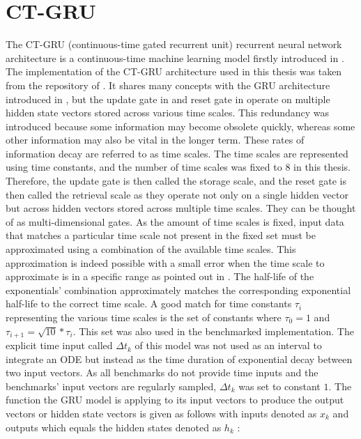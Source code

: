 \documentclass[draft,final]{vutinfth} %
\begin{document}
    \section{CT-GRU} \label{ctgru}
    The CT-GRU (continuous-time gated recurrent unit) recurrent neural network architecture is a continuous-time machine learning model firstly introduced in \cite{CTGRU}.
    The implementation of the CT-GRU architecture used in this thesis was taken from the repository of \cite{ODELSTM}.
    It shares many concepts with the GRU architecture introduced in , but the update gate in  and reset gate in  operate on multiple hidden state vectors stored across various time scales.
    This redundancy was introduced because some information may become obsolete quickly, whereas some other information may also be vital in the longer term.
    These rates of information decay are referred to as time scales.
    The time scales are represented using time constants, and the number of time scales was fixed to $8$ in this thesis.
    Therefore, the update gate is then called the storage scale, and the reset gate is then called the retrieval scale as they operate not only on a single hidden vector but across hidden vectors stored across multiple time scales.
    They can be thought of as multi-dimensional gates.
    As the amount of time scales is fixed, input data that matches a particular time scale not present in the fixed set must be approximated using a combination of the available time scales.
    This approximation is indeed possible with a small error when the time scale to approximate is in a specific range as pointed out in \cite[p. 5-6]{CTGRU}.
    The half-life of the exponentials' combination approximately matches the corresponding exponential half-life to the correct time scale.
    A good match for time constants $\tau_i$ representing the various time scales is the set of constants where $\tau_0=1$ and $\tau_{i+1} = \sqrt{10} * \tau_{i}$.
    This set was also used in the benchmarked implementation.
    The explicit time input called $\Delta t_k$ of this model was not used as an interval to integrate an ODE but instead as the time duration of exponential decay between two input vectors.
    As all benchmarks do not provide time inputs and the benchmarks' input vectors are regularly sampled, $\Delta t_k$ was set to constant $1$.
    The function the GRU model is applying to its input vectors to produce the output vectors or hidden state vectors is given as follows with inputs denoted as $x_k$ and outputs which equals the hidden states denoted as $h_k$ \cite[p. 7]{CTGRU}:
\end{document}
